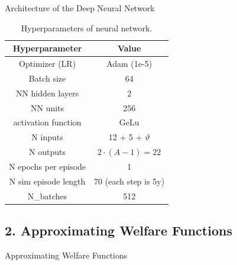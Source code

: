 \documentclass[aspectratio=1610]{beamer}
\begin{document}
\begin{frame}[fragile]{Architecture of the Deep Neural Network}
    \begin{table}[h]
    \centering
    \begin{tabular}{|c|c|}
    \hline
    \textbf{Hyperparameter} & \textbf{Value} \\
    \hline
    Optimizer (LR) & Adam (1e-5) \\
    Batch size & 64 \\
    NN hidden layers & 2 \\
    NN units & 256  \\
    activation function & GeLu \\
    N inputs & 12 + 5 + $\vartheta$ \\
    N outputs & $2\cdot(A-1) = 22$ \\
    N epochs per episode & 1 \\
    N sim episode length & 70 (each step is 5y) \\
    N\_batches & 512 \\
    \hline
    \end{tabular}
    \caption{Hyperparameters of neural network.}
    \label{tab:my_label}
\end{table}

\end{frame}

\subsection[2. Approximating Welfare Functions]{2. Approximating Welfare Functions}

{
\begin{frame}
\Huge \textcolor{uzhblue}{Approximating Welfare Functions}
\end{frame}}
\end{document}
